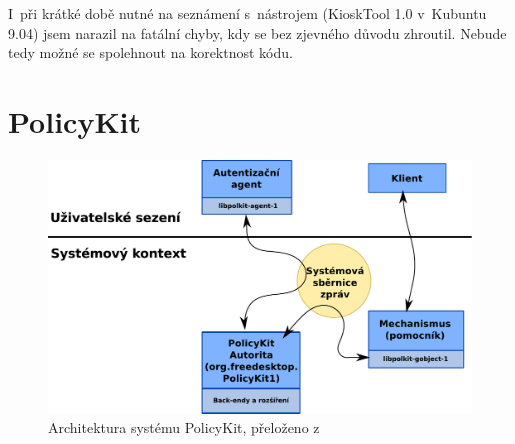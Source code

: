 I~při krátké době nutné na seznámení s~nástrojem (KioskTool 1.0 v~Kubuntu 9.04) jsem narazil na fatální chyby, kdy se bez zjevného důvodu zhroutil. Nebude tedy možné se spolehnout na korektnost kódu.

\section{PolicyKit}
\begin{figure}[h]
    \centering
    \includegraphics[width=12cm]{obrazky/polkit-architecture-vector-cz.pdf}
    \caption{Architektura systému PolicyKit, přeloženo z \cite{manpolkit}}
    \label{fig:polkit_arch}
\end{figure}

